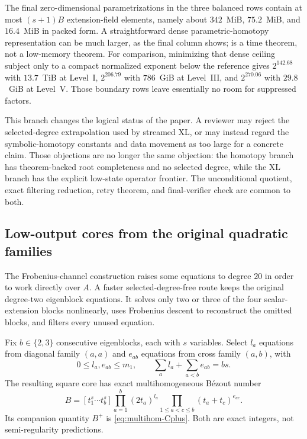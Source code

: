 \documentclass[11pt]{article}
\begin{document}
The final zero-dimensional parametrizations in the three balanced rows contain
at most $(s+1)B$ extension-field elements, namely about $342$~MiB,
$75.2$~MiB, and $16.4$~MiB in packed form.  A straightforward dense
parametric-homotopy representation can be much larger, as the final column
shows;  is a time theorem, not a
low-memory theorem.  For comparison, minimizing that dense ceiling subject
only to a compact normalized exponent below the reference gives
$2^{142.68}$ with $13.7$~TiB at Level~I, $2^{206.79}$ with $786$~GiB at
Level~III, and $2^{270.06}$ with $29.8$~GiB at Level~V.  Those boundary rows
leave essentially no room for suppressed factors.

This branch changes the logical status of the paper.  A reviewer may reject
the selected-degree extrapolation used by streamed XL, or may instead regard
the symbolic-homotopy constants and data movement as too large for a concrete
claim.  Those objections are no longer the same objection: the homotopy branch
has theorem-backed root completeness and no selected degree, while the XL
branch has the explicit low-state operator frontier.  The unconditional
quotient, exact filtering reduction, retry theorem, and final-verifier check
are common to both.


\subsection{Low-output cores from the original quadratic families}
\label{sec:eigenblock-cores}

The Frobenius-channel construction raises some equations to degree $20$ in
order to work directly over $A$.  A faster selected-degree-free route keeps the
original degree-two eigenblock equations.  It solves only two or three
of the four scalar-extension blocks nonlinearly, uses Frobenius descent to
reconstruct the omitted blocks, and filters every unused equation.

Fix $b\in\{2,3\}$ consecutive eigenblocks, each with $s$ variables.  Select
$l_a$ equations from diagonal family $(a,a)$ and $e_{ab}$ equations from
cross family $(a,b)$, with
\begin{equation}\label{eq:eigenblock-square-count}
 0\le l_a,e_{ab}\le m_1,
 \qquad
 \sum_a l_a+\sum_{a<b}e_{ab}=bs.
\end{equation}
The resulting square core has exact multihomogeneous B\'ezout number
\begin{equation}\label{eq:eigenblock-bezout}
 B=
 [t_1^s\cdots t_b^s]
 \prod_{a=1}^{b}(2t_a)^{l_a}
 \prod_{1\le a<c\le b}(t_a+t_c)^{e_{ac}}.
\end{equation}
Its companion quantity $B^+$ is
\eqref{eq:multihom-Cplus}.  Both are exact integers, not semi-regularity
predictions.
\end{document}
